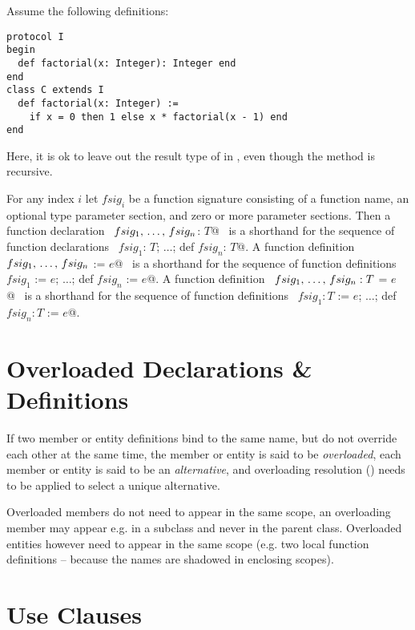 \example Assume the following definitions:
\begin{lstlisting}
protocol I
begin
  def factorial(x: Integer): Integer end
end
class C extends I
  def factorial(x: Integer) :=
    if x = 0 then 1 else x * factorial(x - 1) end
end
\end{lstlisting}
Here, it is ok to leave out the result type of \lstinline@factorial@
in \lstinline@C@, even though the method is recursive. 

For any index $i$ let $fsig_i$ be a function signature consisting of a function
name, an optional type parameter section, and zero or more parameter
sections. Then a function declaration 
~\lstinline@def $fsig_1 ,\, \ldots ,\, fsig_n$: $T$@~ 
is a shorthand for the sequence of function
declarations ~\lstinline@def $fsig_1$: $T$; $\ldots$; def $fsig_n$: $T$@.  
A function definition ~\lstinline@def $fsig_1 ,\, \ldots ,\, fsig_n$ := $e$@~ is a
shorthand for the sequence of function definitions 
~\lstinline@def $fsig_1$ := $e$; $\ldots$; def $fsig_n$ := $e$@.  
A function definition
~\lstinline@def $fsig_1 ,\, \ldots ,\, fsig_n: T$ = $e$@~ is a shorthand for the
sequence of function definitions 
~\lstinline@def $fsig_1: T$ := $e$; $\ldots$; def $fsig_n: T$ := $e$@.






\section{Overloaded Declarations \& Definitions}
\label{sec:overloaded-definitions}

If two member or entity definitions bind to the same name, but do not override each other at the same time, the member or entity is said to be {\em overloaded}, each member or entity is said to be an {\em alternative}, and overloading resolution () needs to be applied to select a unique alternative. 

Overloaded members do not need to appear in the same scope, an overloading member may appear e.g. in a subclass and never in the parent class. Overloaded entities however need to appear in the same scope (e.g. two local function definitions -- because the names are shadowed in enclosing scopes). 





\section{Use Clauses}
\label{sec:use-clauses}

